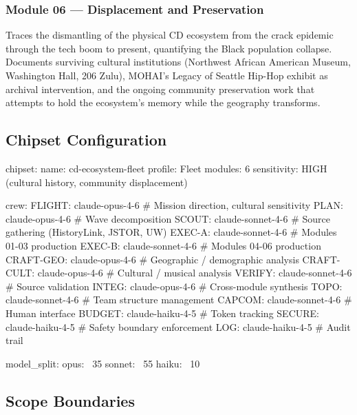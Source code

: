 \documentclass[11pt,letterpaper]{article}
\begin{document}
\subsubsection{Module 06 --- Displacement and Preservation}
Traces the dismantling of the physical CD ecosystem from the crack epidemic through the tech boom to present, quantifying the Black population collapse. Documents surviving cultural institutions (Northwest African American Museum, Washington Hall, 206 Zulu), MOHAI's Legacy of Seattle Hip-Hop exhibit as archival intervention, and the ongoing community preservation work that attempts to hold the ecosystem's memory while the geography transforms.

\subsection{Chipset Configuration}

\begin{asciibox}
chipset:
  name: cd-ecosystem-fleet
  profile: Fleet
  modules: 6
  sensitivity: HIGH (cultural history, community displacement)

  crew:
    FLIGHT:   claude-opus-4-6      # Mission direction, cultural sensitivity
    PLAN:     claude-opus-4-6      # Wave decomposition
    SCOUT:    claude-sonnet-4-6    # Source gathering (HistoryLink, JSTOR, UW)
    EXEC-A:   claude-sonnet-4-6    # Modules 01-03 production
    EXEC-B:   claude-sonnet-4-6    # Modules 04-06 production
    CRAFT-GEO:  claude-opus-4-6    # Geographic / demographic analysis
    CRAFT-CULT: claude-opus-4-6    # Cultural / musical analysis
    VERIFY:   claude-sonnet-4-6    # Source validation
    INTEG:    claude-opus-4-6      # Cross-module synthesis
    TOPO:     claude-sonnet-4-6    # Team structure management
    CAPCOM:   claude-sonnet-4-6    # Human interface
    BUDGET:   claude-haiku-4-5     # Token tracking
    SECURE:   claude-haiku-4-5     # Safety boundary enforcement
    LOG:      claude-haiku-4-5     # Audit trail

  model_split:
    opus:   ~35%
    sonnet: ~55%
    haiku:  ~10%
\end{asciibox}

\subsection{Scope Boundaries}
\end{document}
